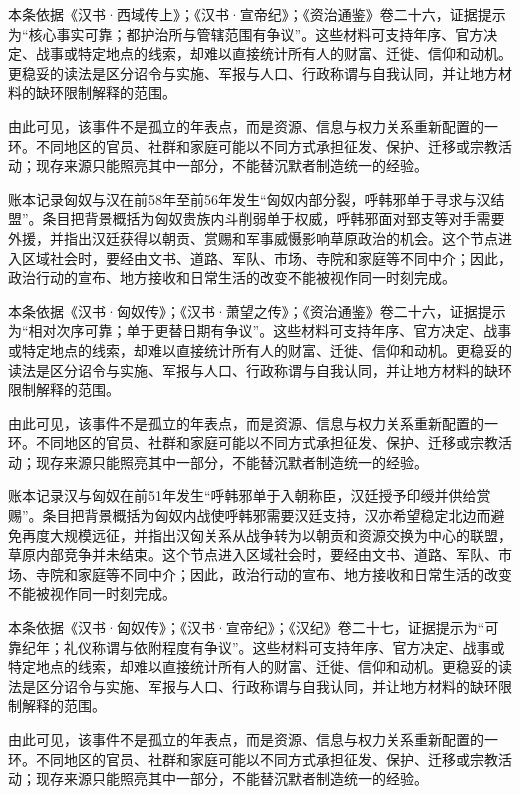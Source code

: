 本条依据《汉书·西域传上》；《汉书·宣帝纪》；《资治通鉴》卷二十六，证据提示为“核心事实可靠；都护治所与管辖范围有争议”。这些材料可支持年序、官方决定、战事或特定地点的线索，却难以直接统计所有人的财富、迁徙、信仰和动机。更稳妥的读法是区分诏令与实施、军报与人口、行政称谓与自我认同，并让地方材料的缺环限制解释的范围。

由此可见，该事件不是孤立的年表点，而是资源、信息与权力关系重新配置的一环。不同地区的官员、社群和家庭可能以不同方式承担征发、保护、迁移或宗教活动；现存来源只能照亮其中一部分，不能替沉默者制造统一的经验。

账本记录匈奴与汉在前58年至前56年发生“匈奴内部分裂，呼韩邪单于寻求与汉结盟”。条目把背景概括为匈奴贵族内斗削弱单于权威，呼韩邪面对郅支等对手需要外援，并指出汉廷获得以朝贡、赏赐和军事威慑影响草原政治的机会。这个节点进入区域社会时，要经由文书、道路、军队、市场、寺院和家庭等不同中介；因此，政治行动的宣布、地方接收和日常生活的改变不能被视作同一时刻完成。

本条依据《汉书·匈奴传》；《汉书·萧望之传》；《资治通鉴》卷二十六，证据提示为“相对次序可靠；单于更替日期有争议”。这些材料可支持年序、官方决定、战事或特定地点的线索，却难以直接统计所有人的财富、迁徙、信仰和动机。更稳妥的读法是区分诏令与实施、军报与人口、行政称谓与自我认同，并让地方材料的缺环限制解释的范围。

由此可见，该事件不是孤立的年表点，而是资源、信息与权力关系重新配置的一环。不同地区的官员、社群和家庭可能以不同方式承担征发、保护、迁移或宗教活动；现存来源只能照亮其中一部分，不能替沉默者制造统一的经验。

账本记录汉与匈奴在前51年发生“呼韩邪单于入朝称臣，汉廷授予印绶并供给赏赐”。条目把背景概括为匈奴内战使呼韩邪需要汉廷支持，汉亦希望稳定北边而避免再度大规模远征，并指出汉匈关系从战争转为以朝贡和资源交换为中心的联盟，草原内部竞争并未结束。这个节点进入区域社会时，要经由文书、道路、军队、市场、寺院和家庭等不同中介；因此，政治行动的宣布、地方接收和日常生活的改变不能被视作同一时刻完成。

本条依据《汉书·匈奴传》；《汉书·宣帝纪》；《汉纪》卷二十七，证据提示为“可靠纪年；礼仪称谓与依附程度有争议”。这些材料可支持年序、官方决定、战事或特定地点的线索，却难以直接统计所有人的财富、迁徙、信仰和动机。更稳妥的读法是区分诏令与实施、军报与人口、行政称谓与自我认同，并让地方材料的缺环限制解释的范围。

由此可见，该事件不是孤立的年表点，而是资源、信息与权力关系重新配置的一环。不同地区的官员、社群和家庭可能以不同方式承担征发、保护、迁移或宗教活动；现存来源只能照亮其中一部分，不能替沉默者制造统一的经验。

